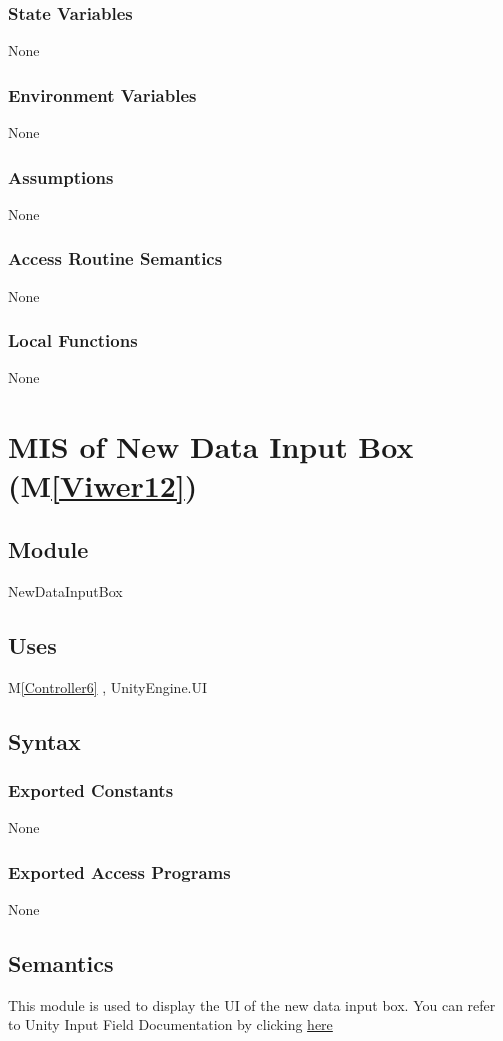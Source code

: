 \documentclass[12pt, titlepage]{article}
\newcommand{\mref}[1]{M\ref{#1}}
\begin{document}
\subsubsection{State Variables}
None
\subsubsection{Environment Variables}
None
\subsubsection{Assumptions}
None
\subsubsection{Access Routine Semantics}
None
\subsubsection{Local Functions}
None

\newpage

\section{MIS of New Data Input Box (\mref{Viwer12})}

\subsection{Module}
NewDataInputBox

\subsection{Uses}
\mref{Controller6} ,
UnityEngine.UI

\subsection{Syntax}
\subsubsection{Exported Constants}
None
\subsubsection{Exported Access Programs}
None

\subsection{Semantics}
This module is used to display the UI of the new data input box.
You can refer to Unity Input Field Documentation by clicking 
\href{https://docs.unity3d.com/Packages/com.unity.ugui@1.0/manual/script-InputField.html}{here}
\end{document}
